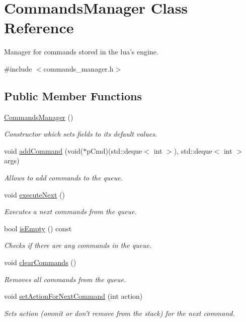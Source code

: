 \hypertarget{class_commands_manager}{\section{Commands\-Manager Class Reference}
\label{class_commands_manager}
}


Manager for commands stored in the lua's engine.  




{\ttfamily \#include $<$commands\-\_\-manager.\-h$>$}

\subsection*{Public Member Functions}
\begin{DoxyCompactItemize}
\item 
\hyperlink{class_commands_manager_a620ebdd3b164ef16266454a719490013}{Commands\-Manager} ()
\begin{DoxyCompactList}\small\item\em Constructor which sets fields to its default values. \end{DoxyCompactList}\item 
void \hyperlink{class_commands_manager_a1044e5df37dbb2b174dc9bc6a894d833}{add\-Command} (void($\ast$p\-Cmd)(std\-::deque$<$ int $>$), std\-::deque$<$ int $>$ args)
\begin{DoxyCompactList}\small\item\em Allows to add commands to the queue. \end{DoxyCompactList}\item 
void \hyperlink{class_commands_manager_a6de7776ecdf30cb6cf09d11213c0dd29}{execute\-Next} ()
\begin{DoxyCompactList}\small\item\em Executes a next commands from the queue. \end{DoxyCompactList}\item 
bool \hyperlink{class_commands_manager_a1fe3f32d1a8fed15559bc14acc74aceb}{is\-Empty} () const 
\begin{DoxyCompactList}\small\item\em Checks if there are any commands in the queue. \end{DoxyCompactList}\item 
void \hyperlink{class_commands_manager_aeda6be0792b5078a4e9c259e00d6456f}{clear\-Commands} ()
\begin{DoxyCompactList}\small\item\em Removes all commands from the queue. \end{DoxyCompactList}\item 
void \hyperlink{class_commands_manager_ae3479cb8bea12e576ae5fcf05f6c6d33}{set\-Action\-For\-Next\-Command} (int action)
\begin{DoxyCompactList}\small\item\em Sets action (ommit or don't remove from the stack) for the next command. \end{DoxyCompactList}\end{DoxyCompactItemize}
